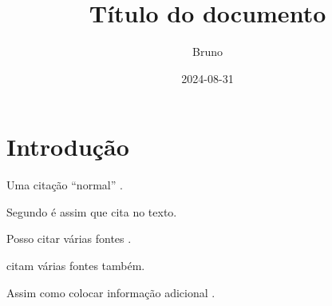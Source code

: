 \documentclass[dsc,male,12pt,a4paper]{ita}
\title{Título do documento}
\author{Bruno}
\date{2024-08-31}
\begin{document}
\frontmatter
\maketitle
\makecip

\tableofcontents

\mainmatter
\chapter{Introdução}
Uma citação ``normal'' \cite{silvaBIM4DNo2019}.

Segundo \textcite{dynamoDynamoBIM} é assim que cita no texto.

Posso citar várias fontes \cites{nrelEnergyPlus2024,ronzaniEstudoITAPara2020}.

\textcites{wenProgressTrendBIM2021,autodeskNavisworks3DModel2024} citam várias fontes também.

Assim como colocar informação adicional \cite[pre][post]{pauwelsIFCtoRDF2024}.

\printbibliography
\end{document}
